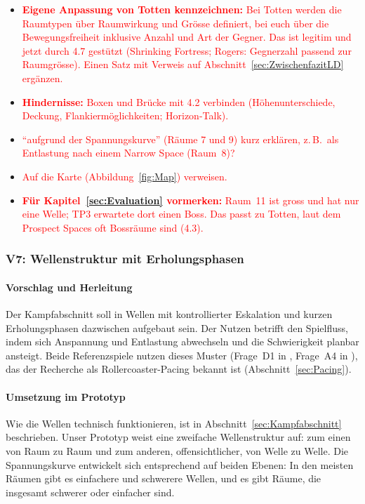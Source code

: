 \documentclass[../Main.tex]{subfiles}
\begin{document}
\begin{itemize}[leftmargin=1.5cm]
    \item \textcolor{red}{\textbf{Eigene Anpassung von Totten kennzeichnen:} Bei Totten werden die Raumtypen über Raumwirkung und Grösse definiert, bei euch über die Bewegungsfreiheit inklusive Anzahl und Art der Gegner. Das ist legitim und jetzt durch 4.7 gestützt (Shrinking Fortress; Rogers: Gegnerzahl passend zur Raumgrösse). Einen Satz mit Verweis auf Abschnitt~\ref{sec:ZwischenfazitLD} ergänzen.}
    \item \textcolor{red}{\textbf{Hindernisse:} Boxen und Brücke mit 4.2 verbinden (Höhenunterschiede, Deckung, Flankiermöglichkeiten; Horizon-Talk).}
    \item \textcolor{red}{\enquote{aufgrund der Spannungskurve} (Räume 7 und 9) kurz erklären, z.\,B.\ als Entlastung nach einem Narrow Space (Raum~8)?}
    \item \textcolor{red}{Auf die Karte (Abbildung~\ref{fig:Map}) verweisen.}
    \item \textcolor{red}{\textbf{Für Kapitel~\ref{sec:Evaluation} vormerken:} Raum~11 ist gross und hat nur eine Welle; TP3 erwartete dort einen Boss. Das passt zu Totten, laut dem Prospect Spaces oft Bossräume sind (4.3).}
\end{itemize}

\subsubsection{V7: Wellenstruktur mit Erholungsphasen} \label{sec:V7}

\paragraph{Vorschlag und Herleitung}
Der Kampfabschnitt soll in Wellen mit kontrollierter Eskalation und kurzen Erholungsphasen dazwischen aufgebaut sein. Der Nutzen betrifft den Spielfluss, indem sich Anspannung und Entlastung abwechseln und die Schwierigkeit planbar ansteigt. Beide Referenzspiele nutzen dieses Muster (Frage~D1 in , Frage~A4 in ), das der Recherche als Rollercoaster-Pacing bekannt ist (Abschnitt~\ref{sec:Pacing}).

\paragraph{Umsetzung im Prototyp}
Wie die Wellen technisch funktionieren, ist in Abschnitt~\ref{sec:Kampfabschnitt} beschrieben. Unser Prototyp weist eine zweifache Wellenstruktur auf: zum einen von Raum zu Raum und zum anderen, offensichtlicher, von Welle zu Welle. Die Spannungskurve entwickelt sich entsprechend auf beiden Ebenen: In den meisten Räumen gibt es einfachere und schwerere Wellen, und es gibt Räume, die insgesamt schwerer oder einfacher sind.
\end{document}
